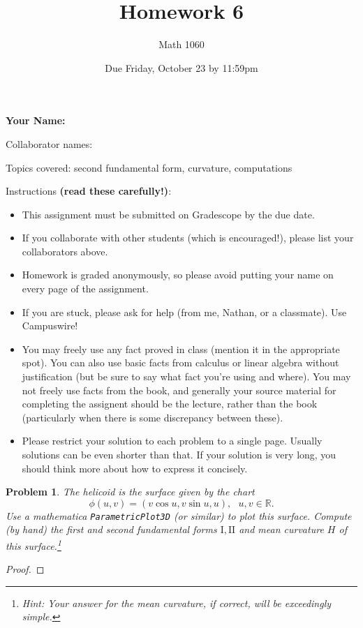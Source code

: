 \documentclass[11pt]{article}
\author{Math 1060}
\date{Due Friday, October 23 by 11:59pm}
\title{Homework 6}
\newtheorem{problem}{Problem}
\begin{document}
\maketitle


{\bf\Large Your Name:} 

Collaborator names: 


\vspace{.3in}
Topics covered: second fundamental form, curvature, computations

Instructions {\bf (read these carefully!)}: 
\begin{itemize}
\item This assignment must be submitted on Gradescope by the due date. 
\item If you collaborate with other students (which is encouraged!), please list your collaborators above. 
\item Homework is graded anonymously, so please avoid putting your name on every page of the assignment.
\item If you are stuck, please ask for help (from me, Nathan, or a classmate). Use Campuswire!  
\item You may freely use any fact proved in class (mention it in the appropriate spot). You can also use basic facts from calculus or linear algebra without justification (but be sure to say what fact you're using and where). You may not freely use facts from the book, and generally your source material for completing the assignent should be the lecture, rather than the book (particularly when there is some discrepancy between these). 
\item Please restrict your solution to each problem to a single page. Usually solutions can be even shorter than that. If your solution is very long, you should think more about how to express it concisely.
\end{itemize}
\pagebreak 


\begin{problem}
The helicoid is the surface given by the chart
\[\phi(u,v)=(v\cos u,v\sin u,u), \>\>\>u,v\in\mathbb R.\]
Use a mathematica \texttt{ParametricPlot3D} (or similar) to plot this surface. Compute (by hand) the first and second fundamental forms $\mathrm I,\mathrm{I\!I}$ and mean curvature $H$ of this surface.\footnote{Hint: Your answer for the mean curvature, if correct, will be exceedingly simple.} 
\end{problem}

\begin{proof}

\end{proof}
\end{document}
